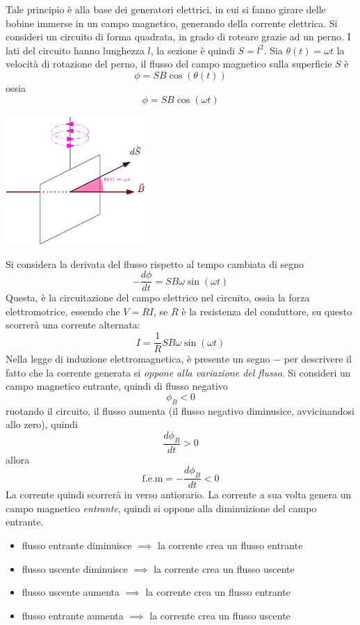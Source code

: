 \documentclass[10pt, letterpaper]{report}
\begin{document}
Tale principio è alla base dei generatori elettrici, in cui si fanno girare delle bobine immerse in un campo magnetico, generando della corrente elettrica. \acc Si consideri un circuito di forma quadrata, in grado di roteare grazie ad un perno. I lati del circuito hanno lunghezza $l$, la sezione è quindi $S=l^2$. Sia $\theta(t)=\omega t$ la velocità di rotazione del perno, il flusso del campo magnetico sulla superficie $S$ è 
$$ \phi=SB\cos(\theta(t))$$
ossia 
$$ \phi = SB\cos(\omega t)$$\begin{center}
    \includegraphics[width=0.4\textwidth ]{images/Faraday3.pdf}
\end{center}
Si considera la derivata del flusso rispetto al tempo cambiata di segno
$$ -\dfrac{d\phi}{dt}=SB\omega\sin(\omega t)$$
Questa, è la circuitazione del campo elettrico nel circuito, ossia la forza elettromotrice, essendo che $V=RI$, se $R$ è la resistenza del conduttore, su questo scorrerà una corrente alternata:
$$ I=\frac{1}{R}SB\omega\sin(\omega t)$$
Nella legge di induzione elettromagnetica, è presente un segno $-$ per descrivere il fatto che la corrente generata si \textit{oppone alla variazione del flusso}. Si consideri un campo magnetico entrante, quindi di flusso negativo $$\phi_B<0$$
ruotando il circuito, il flusso aumenta (il flusso negativo diminusice, avvicinandosi allo zero), quindi 
$$ \frac{d\phi_B}{dt}>0$$
allora 
$$ \text{f.e.m}=-\frac{d\phi_B}{dt} <0$$
La corrente quindi scorrerà in verso antiorario. La corrente a sua volta genera un campo magnetico \textit{entrante}, quindi si oppone alla diminuizione del campo entrante. 
\begin{itemize}
    \item flusso entrante diminuisce $\implies$ la corrente crea un flusso entrante  
    \item flusso uscente diminuisce $\implies$ la corrente crea un flusso uscente 
    \item flusso uscente aumenta $\implies$ la corrente crea un flusso entrante  
    \item flusso entrante aumenta $\implies$ la corrente crea un flusso uscente 
\end{itemize}
\end{document}
